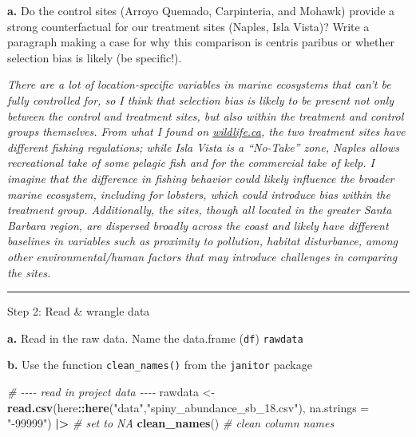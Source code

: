 \documentclass[
]{article}
\newenvironment{Shaded}{\begin{snugshade}}{\end{snugshade}}
\newcommand{\AttributeTok}[1]{\textcolor[rgb]{0.13,0.29,0.53}{#1}}
\newcommand{\CommentTok}[1]{\textcolor[rgb]{0.56,0.35,0.01}{\textit{#1}}}
\newcommand{\FunctionTok}[1]{\textcolor[rgb]{0.13,0.29,0.53}{\textbf{#1}}}
\newcommand{\NormalTok}[1]{#1}
\newcommand{\OtherTok}[1]{\textcolor[rgb]{0.56,0.35,0.01}{#1}}
\newcommand{\SpecialCharTok}[1]{\textcolor[rgb]{0.81,0.36,0.00}{\textbf{#1}}}
\newcommand{\StringTok}[1]{\textcolor[rgb]{0.31,0.60,0.02}{#1}}
\begin{document}
\textbf{a.} Do the control sites (Arroyo Quemado, Carpinteria, and
Mohawk) provide a strong counterfactual for our treatment sites (Naples,
Isla Vista)? Write a paragraph making a case for why this comparison is
centris paribus or whether selection bias is likely (be specific!).

\emph{There are a lot of location-specific variables in marine
ecosystems that can't be fully controlled for, so I think that selection
bias is likely to be present not only between the control and treatment
sites, but also within the treatment and control groups themselves. From
what I found on
\href{https://wildlife.ca.gov/Conservation/Marine/MPAs/Naples}{wildlife.ca},
the two treatment sites have different fishing regulations; while Isla
Vista is a ``No-Take'' zone, Naples allows recreational take of some
pelagic fish and for the commercial take of kelp. I imagine that the
difference in fishing behavior could likely influence the broader marine
ecosystem, including for lobsters, which could introduce bias within the
treatment group. Additionally, the sites, though all located in the
greater Santa Barbara region, are dispersed broadly across the coast and
likely have different baselines in variables such as proximity to
pollution, habitat disturbance, among other environmental/human factors
that may introduce challenges in comparing the sites.}

\begin{center}\rule{0.5\linewidth}{0.5pt}\end{center}

Step 2: Read \& wrangle data

\textbf{a.} Read in the raw data. Name the data.frame (\texttt{df})
\texttt{rawdata}

\textbf{b.} Use the function \texttt{clean\_names()} from the
\texttt{janitor} package

\begin{Shaded}
\begin{Highlighting}[]
\CommentTok{\# {-}{-}{-}{-} read in project data {-}{-}{-}{-}}
\NormalTok{rawdata }\OtherTok{\textless{}{-}} \FunctionTok{read.csv}\NormalTok{(here}\SpecialCharTok{::}\FunctionTok{here}\NormalTok{(}\StringTok{"data"}\NormalTok{,}\StringTok{"spiny\_abundance\_sb\_18.csv"}\NormalTok{), }
                    \AttributeTok{na.strings =} \StringTok{"{-}99999"}\NormalTok{) }\SpecialCharTok{|\textgreater{}} \CommentTok{\# set to NA}
    \FunctionTok{clean\_names}\NormalTok{() }\CommentTok{\# clean column names}
\end{Highlighting}
\end{Shaded}
\end{document}
